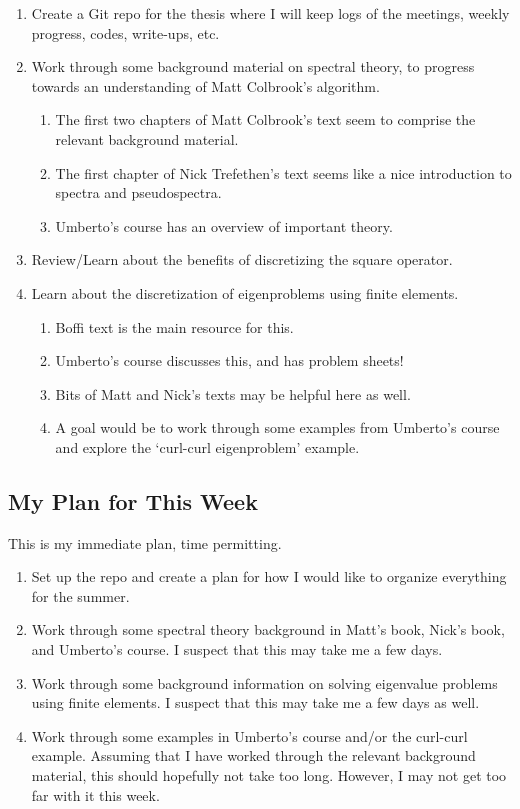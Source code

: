 \documentclass[12pt,a4paper]{article}
\begin{document}
\begin{enumerate}
    \item Create a Git repo for the thesis where I will keep logs of the meetings, weekly progress, codes, write-ups, etc.
    \item Work through some background material on spectral theory, to progress towards an understanding of Matt Colbrook's algorithm. 
    \begin{enumerate}
        \item The first two chapters of Matt Colbrook's text seem to comprise the relevant background material. 
        \item The first chapter of Nick Trefethen's text seems like a nice introduction to spectra and pseudospectra. 
        \item Umberto's course has an overview of important theory.
    \end{enumerate}
    \item Review/Learn about the benefits of discretizing the square operator. 
    \item Learn about the discretization of eigenproblems using finite elements. 
    \begin{enumerate}
        \item Boffi text is the main resource for this.
        \item Umberto's course discusses this, and has problem sheets! 
        \item Bits of Matt and Nick's texts may be helpful here as well. 
        \item A goal would be to work through some examples from Umberto's course and explore the `curl-curl eigenproblem' example. 
    \end{enumerate}
\end{enumerate}


\subsection{My Plan for This Week}


This is my immediate plan, time permitting.

\begin{enumerate}

    \item Set up the repo and create a plan for how I would like to organize everything for the summer. 
    \item Work through some spectral theory background in Matt's book, Nick's book, and Umberto's course. I suspect that this may take me a few days.
    \item Work through some background information on solving eigenvalue problems using finite elements. I suspect that this may take me a few days as well.
    \item Work through some examples in Umberto's course and/or the curl-curl example. Assuming that I have worked through the relevant background material, this should hopefully not take too long. However, I may not get too far with it this week. 
\end{enumerate}
\end{document}
